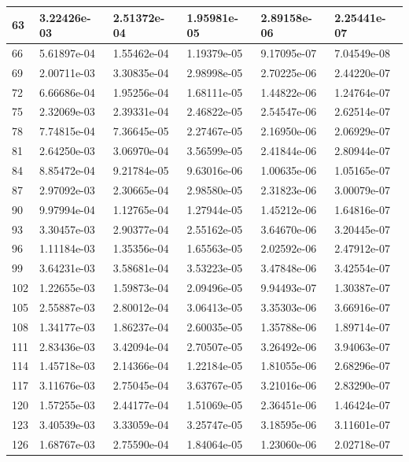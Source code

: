 \documentclass{article}
\begin{document}
\begin{table}[H]
\begin{tabular}{|l|l|l|l|l|l|}
63 & 3.22426e-03 & 2.51372e-04 & 1.95981e-05 & 2.89158e-06 & 2.25441e-07 \\ \hline
66 & 5.61897e-04 & 1.55462e-04 & 1.19379e-05 & 9.17095e-07 & 7.04549e-08 \\ \hline
69 & 2.00711e-03 & 3.30835e-04 & 2.98998e-05 & 2.70225e-06 & 2.44220e-07 \\ \hline
72 & 6.66686e-04 & 1.95256e-04 & 1.68111e-05 & 1.44822e-06 & 1.24764e-07 \\ \hline
75 & 2.32069e-03 & 2.39331e-04 & 2.46822e-05 & 2.54547e-06 & 2.62514e-07 \\ \hline
78 & 7.74815e-04 & 7.36645e-05 & 2.27467e-05 & 2.16950e-06 & 2.06929e-07 \\ \hline
81 & 2.64250e-03 & 3.06970e-04 & 3.56599e-05 & 2.41844e-06 & 2.80944e-07 \\ \hline
84 & 8.85472e-04 & 9.21784e-05 & 9.63016e-06 & 1.00635e-06 & 1.05165e-07 \\ \hline
87 & 2.97092e-03 & 2.30665e-04 & 2.98580e-05 & 2.31823e-06 & 3.00079e-07 \\ \hline
90 & 9.97994e-04 & 1.12765e-04 & 1.27944e-05 & 1.45212e-06 & 1.64816e-07 \\ \hline
93 & 3.30457e-03 & 2.90377e-04 & 2.55162e-05 & 3.64670e-06 & 3.20445e-07 \\ \hline
96 & 1.11184e-03 & 1.35356e-04 & 1.65563e-05 & 2.02592e-06 & 2.47912e-07 \\ \hline
99 & 3.64231e-03 & 3.58681e-04 & 3.53223e-05 & 3.47848e-06 & 3.42554e-07 \\ \hline
102 & 1.22655e-03 & 1.59873e-04 & 2.09496e-05 & 9.94493e-07 & 1.30387e-07 \\ \hline
105 & 2.55887e-03 & 2.80012e-04 & 3.06413e-05 & 3.35303e-06 & 3.66916e-07 \\ \hline
108 & 1.34177e-03 & 1.86237e-04 & 2.60035e-05 & 1.35788e-06 & 1.89714e-07 \\ \hline
111 & 2.83436e-03 & 3.42094e-04 & 2.70507e-05 & 3.26492e-06 & 3.94063e-07 \\ \hline
114 & 1.45718e-03 & 2.14366e-04 & 1.22184e-05 & 1.81055e-06 & 2.68296e-07 \\ \hline
117 & 3.11676e-03 & 2.75045e-04 & 3.63767e-05 & 3.21016e-06 & 2.83290e-07 \\ \hline
120 & 1.57255e-03 & 2.44177e-04 & 1.51069e-05 & 2.36451e-06 & 1.46424e-07 \\ \hline
123 & 3.40539e-03 & 3.33059e-04 & 3.25747e-05 & 3.18595e-06 & 3.11601e-07 \\ \hline
126 & 1.68767e-03 & 2.75590e-04 & 1.84064e-05 & 1.23060e-06 & 2.02718e-07 \\ \hline

\end{tabular}
\end{table}
\end{document}
